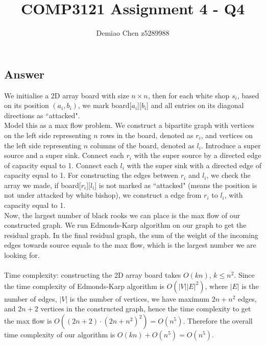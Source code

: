 \documentclass[12pt]{article}
\title{COMP3121 Assignment 4 - Q4}
\author{Demiao Chen z5289988}
\begin{document}
\maketitle
{}

\subsection*{Answer}
We initialise a 2D array board with size $n \times n$, 
then for each white shop $s_i$,
based on its position $(a_i, b_i)$, we mark board[$a_i$][$b_i$] and all 
entries on its diagonal directions as ``attacked".\\
Model this as a max flow problem. We construct a 
bipartite graph with vertices on the left side 
representing $n$ rows in the board,  denoted as $r_i$,
and vertices on the left side representing $n$ columns of 
the board, denoted as $l_i$.
Introduce a super source and a super sink.
Connect each $r_i$ with the super source 
by a directed edge of capacity equal to 1.
Connect each $l_i$ with the super
sink with a directed edge of capacity equal to 1.
For constructing the edges between $r_i$ and $l_i$, we check 
the array we made, if board[$r_i$][$l_i$] is not marked as 
``attacked" (means the position is not under attacked by white bishop), 
we construct a edge from $r_i$ to $l_i$, with capacity equal to 
1. \\
Now, the largest number of black rooks we can place is the max flow 
of our constructed graph. We run Edmonds-Karp algorithm on our
graph to get the residual graph. In the ﬁnal residual graph, 
the sum of the weight of the incoming edges towards source equals to 
the max flow, which is the largest number we are looking for.\\\\
Time complexity: constructing the 2D array board takes $O(kn)$, $k \le n^2$.
Since the time complexity of 
Edmonds-Karp algorithm is $O( | V || E | ^2 )$, 
where $|E|$ is the number of edges, $| V |$ is the number of 
vertices, we have maximum $2n + n^2$ edges, 
and $2n + 2$ vertices in the constructed graph, 
hence the time complexity to get the  max flow is $O((2n + 2) \cdot (2n+n^2)^2) = O(n^5)$.
Therefore the overall time complexity of our algorithm is $O(kn) + O(n^5) = O(n^5)$.
\end{document}
